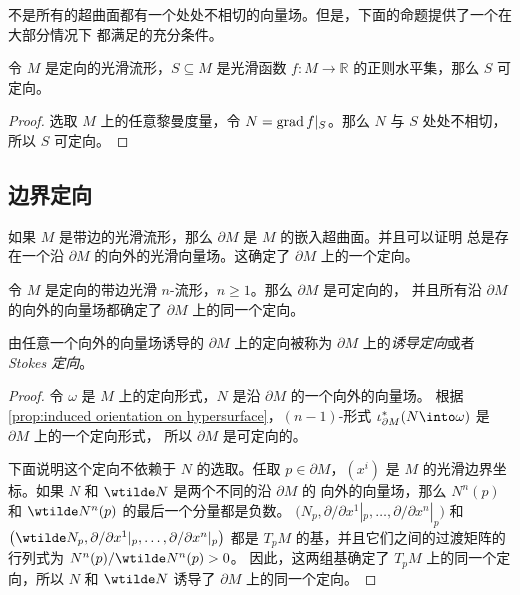 不是所有的超曲面都有一个处处不相切的向量场。但是，下面的命题提供了一个在大部分情况下
都满足的充分条件。

\begin{proposition}
  令 $M$ 是定向的光滑流形，$S\subseteq M$ 是光滑函数 $f:M\to \mathbb{R}$
  的正则水平集，那么 $S$ 可定向。
\end{proposition}
\begin{proof}
  选取 $M$ 上的任意黎曼度量，令 $N=\operatorname{grad} f|_S$。那么 $N$ 与 $S$ 处处不相切，
  所以 $S$ 可定向。
\end{proof}

\subsection{边界定向}

如果 $M$ 是带边的光滑流形，那么 $\partial M$ 是 $M$ 的嵌入超曲面。并且可以证明
总是存在一个沿 $\partial M$ 的向外的光滑向量场。这确定了 $\partial M$ 上的一个定向。

\begin{proposition}[边界上的诱导定向]
  令 $M$ 是定向的带边光滑 $n$-流形，$n\geq 1$。那么 $\partial M$ 是可定向的，
  并且所有沿 $\partial M$ 的向外的向量场都确定了 $\partial M$ 上的同一个定向。
\end{proposition}
\begin{remark}
  由任意一个向外的向量场诱导的 $\partial M$ 上的定向被称为 $\partial M$
  上的\emph{诱导定向}或者\emph{Stokes 定向}。
\end{remark}
\begin{proof}
  令 $\omega$ 是 $M$ 上的定向形式，$N$ 是沿 $\partial M$ 的一个向外的向量场。
  根据 \autoref{prop:induced orientation on hypersurface}，$(n-1)$-形式
  $\iota_{\partial M}^*(N\into\omega)$ 是 $\partial M$ 上的一个定向形式，
  所以 $\partial M$ 是可定向的。

  下面说明这个定向不依赖于 $N$ 的选取。任取 $p\in\partial M$，$(x^i)$ 
  是 $M$ 的光滑边界坐标。如果 $N$ 和 $\wtilde N$ 是两个不同的沿 $\partial M$ 的
  向外的向量场，那么 $N^n(p)$ 和 $\wtilde N^n(p)$ 的最后一个分量都是负数。
  $\bigl(N_p,\partial/\partial x^1|_p,\dots,\partial/\partial x^n|_p\bigr)$
  和 $\bigl(\wtilde N_p,\partial/\partial x^1|_p,\dots,\partial/\partial x^n|_p\bigr)$
  都是 $T_pM$ 的基，并且它们之间的过渡矩阵的行列式为 $N^n(p)/\wtilde N^n(p)>0$。
  因此，这两组基确定了 $T_pM$ 上的同一个定向，所以 $N$ 和 $\wtilde N$ 诱导了 $\partial M$ 上的同一个定向。
\end{proof}

